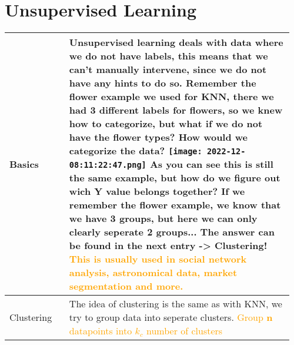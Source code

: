 \documentclass[main.tex,fontsize=8pt,paper=a4,paper=portrait,DIV=calc,]{scrartcl}
\begin{document}
\begin{table}[ht!]
\section{Unsupervised Learning}
\begin{tabular}{|m{0.2\linewidth}|m{0.755\linewidth}|}
\hline
Basics & 
Unsupervised learning deals with data where we do not have labels, this means that we can't manually intervene, since we do not have any hints to do so.\newline
Remember the flower example we used for KNN, there we had 3 different labels for flowers, so we knew how to categorize, but what if we do not have the flower types? How would we categorize the data?\newline 
\texttt{[image: 2022-12-08:11:22:47.png]}\newline
As you can see this is still the same example, but how do we figure out wich Y value belongs together? If we remember the flower example, we know that we have 3 groups, but here we can only clearly seperate 2 groups... The answer can be found in the next entry -> \textbf{Clustering!}
\textcolor{orange}{This is usually used in social network analysis, astronomical data, market segmentation and more.}\\
\hline
Clustering & 
The idea of clustering is the same as with KNN, we try to group data into seperate clusters.\newline
\textcolor{orange}{Group \textbf{n} datapoints into \textbf{\(k_c\)} number of clusters}\newline
\\
\hline
\end{tabular}
\end{table}
\pagebreak
\end{document}
